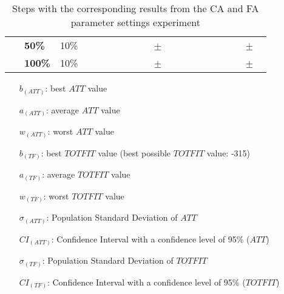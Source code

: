 \begin{sidewaystable}
\begin{tabular}{|l|l|l||c|c|c|c|c|c|c|c|c|c|}
    ~ & \textbf{50\%} & 10\% & ~ & ~ & ~ & ~ & ~ $\pm$ ~ & ~ & ~ & ~ & ~ & ~ $\pm$ ~ \\
    ~ & \textbf{100\%} & 10\% & ~ & ~ & ~ & ~ & ~ $\pm$ ~ & ~ & ~ & ~ & ~ & ~ $\pm$ ~ \\
    \hline
    \end{tabular}
    \caption {Steps with the corresponding results from the CA and FA parameter settings experiment}
    \tiny
    \begin{itemize}[noitemsep]
    \item[$b_{(ATT)}$:] best $ATT$ value
    \item[$a_{(ATT)}$:] average $ATT$ value
    \item[$w_{(ATT)}$:] worst $ATT$ value
    \item[$b_{(TF)}$:] best $TOTFIT$ value (best possible $TOTFIT$ value: -315)
    \item[$a_{(TF)}$:] average $TOTFIT$ value
    \item[$w_{(TF)}$:] worst $TOTFIT$ value
    \item[$\sigma_{(ATT)}$:] Population Standard Deviation of $ATT$
    \item[$CI_{(ATT)}$:] Confidence Interval with a confidence level of 95\% ($ATT$)
    \item[$\sigma_{(TF)}$:] Population Standard Deviation of $TOTFIT$
    \item[$CI_{(TF)}$:] Confidence Interval with a confidence level of 95\% ($TOTFIT$)
    \end{itemize}
    \label{table:pm2}
\end{sidewaystable}



